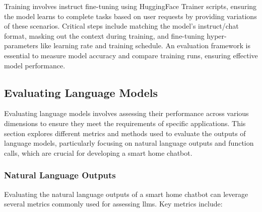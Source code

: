 Training involves instruct fine-tuning using HuggingFace Trainer scripts, ensuring the model learns to complete tasks based on user requests by providing variations of these scenarios. Critical steps include matching the model's instruct/chat format, masking out the context during training, and fine-tuning hyper-parameters like learning rate and training schedule.
An evaluation framework is essential to measure model accuracy and compare training runs, ensuring effective model performance.


\subsection{Evaluating Language Models}
\label{sec:relatedeval}
Evaluating language models involves assessing their performance across various dimensions to ensure they meet the requirements of specific applications. This section explores different metrics and methods used to evaluate the outputs of language models, particularly focusing on natural language outputs and function calls, which are crucial for developing a smart home chatbot.

\subsubsection{Natural Language Outputs}
Evaluating the natural language outputs of a smart home chatbot can leverage several metrics commonly used for assessing \glspl{llm}. Key metrics include:


